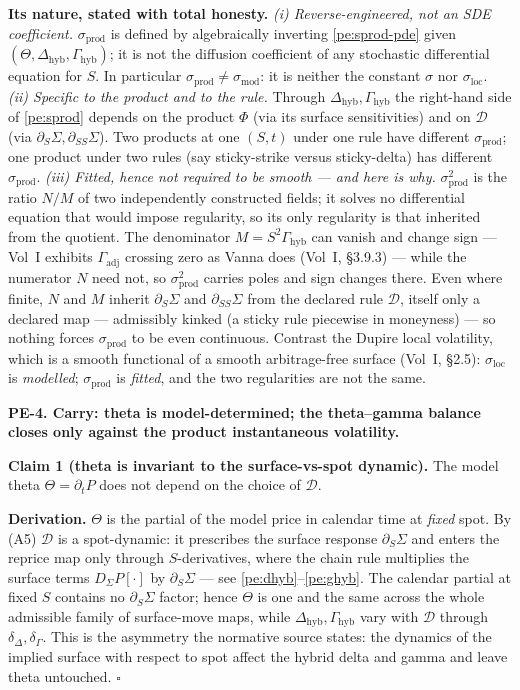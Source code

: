 \documentclass[11pt,a4paper]{article}
\newcommand{\pelabel}[1]{\leavevmode\hypertarget{pe-#1}{}%
  \marginpar{\raggedright\scriptsize\ttfamily\textcolor{gray}{#1}}}
\newcommand{\trace}[1]{\par\smallskip{\small\itshape (#1)}}
\newcommand{\Gadj}{\Gamma_{\mathrm{adj}}}
\newcommand{\smod}{\sigma_{\mathrm{mod}}}
\newcommand{\sprod}{\sigma_{\mathrm{prod}}}
\newcommand{\Dhyb}{\Delta_{\mathrm{hyb}}}
\newcommand{\Ghyb}{\Gamma_{\mathrm{hyb}}}
\begin{document}
\textbf{Its nature, stated with total honesty.}
\emph{(i) Reverse-engineered, not an SDE coefficient.} $\sprod$ is defined by
algebraically inverting \eqref{pe:sprod-pde} given $(\Theta,\Dhyb,\Ghyb)$; it is
not the diffusion coefficient of any stochastic differential equation for $S$.
In particular $\sprod \neq \smod$: it is neither the constant $\sigma$ nor
$\sigma_{\mathrm{loc}}$.
\emph{(ii) Specific to the product and to the rule.} Through $\Dhyb,\Ghyb$ the
right-hand side of \eqref{pe:sprod} depends on the product $\Phi$ (via its
surface sensitivities) and on $\mathcal{D}$ (via $\partial_S\Sigma,
\partial_{SS}\Sigma$). Two products at one $(S,t)$ under one rule have different
$\sprod$; one product under two rules (say sticky-strike versus sticky-delta)
has different $\sprod$.
\emph{(iii) Fitted, hence not required to be smooth --- and here is why.}
$\sprod^2$ is the ratio $N/M$ of two independently constructed fields; it solves
no differential equation that would impose regularity, so its only regularity is
that inherited from the quotient. The denominator $M=S^2\Ghyb$ can vanish and
change sign --- Vol~I exhibits $\Gadj$ crossing zero as Vanna does
(Vol~I, \S3.9.3) --- while the numerator $N$ need not, so
$\sprod^2$ carries poles and sign changes there. Even where finite, $N$ and $M$
inherit $\partial_S\Sigma$ and $\partial_{SS}\Sigma$ from the declared rule
$\mathcal{D}$, itself only a declared map --- admissibly kinked (a
sticky rule piecewise in moneyness) --- so nothing forces $\sprod$ to be even
continuous. Contrast the Dupire local volatility, which is a smooth functional
of a smooth arbitrage-free surface (Vol~I, \S2.5): $\sigma_{\mathrm{loc}}$ is
\emph{modelled}; $\sprod$ is \emph{fitted}, and the two regularities are not the
same.
\trace{Correctness; VM-4, VM-6; Vol~I \S2.5, \S3.9.}

\pelabel{PE-4}\textbf{PE-4. Carry: theta is model-determined; the theta--gamma
balance closes only against the product instantaneous volatility.}

\textbf{Claim 1 (theta is invariant to the surface-vs-spot dynamic).} The model
theta $\Theta=\partial_t P$ does not depend on the choice of $\mathcal{D}$.

\textbf{Derivation.} $\Theta$ is the partial of the model price in calendar time
at \emph{fixed} spot. By (A5) $\mathcal{D}$ is a spot-dynamic: it prescribes the
surface response $\partial_S\Sigma$ and enters the reprice map only through
$S$-derivatives, where the chain rule multiplies the surface terms
$D_\Sigma P[\cdot]$ by $\partial_S\Sigma$ --- see
\eqref{pe:dhyb}--\eqref{pe:ghyb}. The calendar partial at fixed $S$ contains no
$\partial_S\Sigma$ factor; hence $\Theta$ is one and the same across the whole
admissible family of surface-move maps, while $\Dhyb,\Ghyb$ vary with
$\mathcal{D}$ through $\delta_\Delta,\delta_\Gamma$. This is the asymmetry the
normative source states: the dynamics of the implied surface with respect to
spot affect the hybrid delta and gamma and leave theta untouched. $\square$
\end{document}
